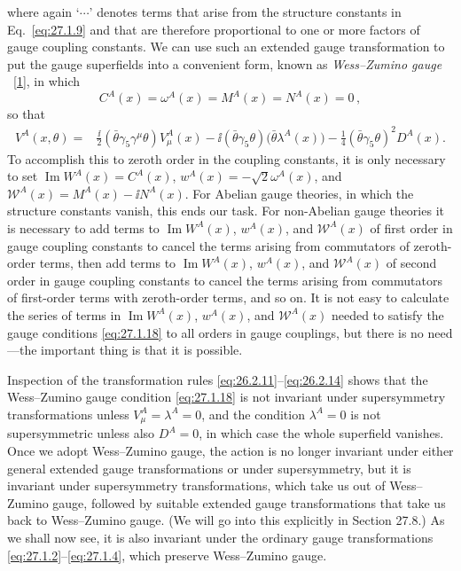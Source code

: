 where again `\(\cdots\)' denotes terms that arise from the structure
constants in Eq.~\eqref{eq:27.1.9} and that are therefore proportional
to one or more factors of gauge coupling constants. We can use such an
extended gauge transformation to put the gauge superfields into a
convenient form, known as \textit{Wess--Zumino gauge}
~\hyperref[ch27-ref-1]{[1]}, in which
\begin{equation}
  C^A(x)=\omega^A(x)=M^A(x)=N^A(x)=0\,,
  \tag{27.1.18}\label{eq:27.1.18}
\end{equation}
so that
\begin{equation}
  \begin{aligned}
  V^A(x,\theta)={}&
  \frac{\ii}{2}(\bar\theta\gamma_5\gamma^\mu\theta)V^A_\mu(x)
  -\ii(\bar\theta\gamma_5\theta)\bigl(\bar\theta\lambda^A(x)\bigr)
  -\frac14(\bar\theta\gamma_5\theta)^2D^A(x).
  \end{aligned}
  \tag{27.1.19}\label{eq:27.1.19}
\end{equation}
To accomplish this to zeroth order in the coupling constants, it is only
necessary to set \(\operatorname{Im}W^A(x)=C^A(x)\),
\(w^A(x)=-\sqrt{2}\omega^A(x)\), and
\(\mathcal{W}^A(x)=M^A(x)-\ii N^A(x)\). For Abelian gauge theories, in which
the structure constants vanish, this ends our task. For non-Abelian gauge
theories it is necessary to add terms to \(\operatorname{Im}W^A(x)\),
\(w^A(x)\), and \(\mathcal{W}^A(x)\) of first order in gauge coupling
constants to cancel the terms arising from commutators of zeroth-order
terms, then add terms to \(\operatorname{Im}W^A(x)\), \(w^A(x)\), and
\(\mathcal{W}^A(x)\) of second order in gauge coupling constants to cancel
the terms arising from commutators of first-order terms with zeroth-order
terms, and so on. It is not easy to calculate the series of terms in
\(\operatorname{Im}W^A(x)\), \(w^A(x)\), and \(\mathcal{W}^A(x)\) needed
to satisfy the gauge conditions \eqref{eq:27.1.18} to all orders in gauge
couplings, but there is no need---the important thing is that it is possible.

Inspection of the transformation rules
\eqref{eq:26.2.11}--\eqref{eq:26.2.14} shows that the Wess--Zumino gauge
condition \eqref{eq:27.1.18} is not invariant under supersymmetry
transformations unless \(V^A_\mu=\lambda^A=0\), and the condition
\(\lambda^A=0\) is not supersymmetric unless also \(D^A=0\), in which
case the whole superfield vanishes. Once we adopt Wess--Zumino gauge, the
action is no longer invariant under either general extended gauge
transformations or under supersymmetry, but it is invariant under
supersymmetry transformations, which take us out of Wess--Zumino gauge,
followed by suitable extended gauge transformations that take us back to
Wess--Zumino gauge. (We will go into this explicitly in Section 27.8.) As
we shall now see, it is also invariant under the ordinary gauge
transformations \eqref{eq:27.1.2}--\eqref{eq:27.1.4}, which preserve
Wess--Zumino gauge.

